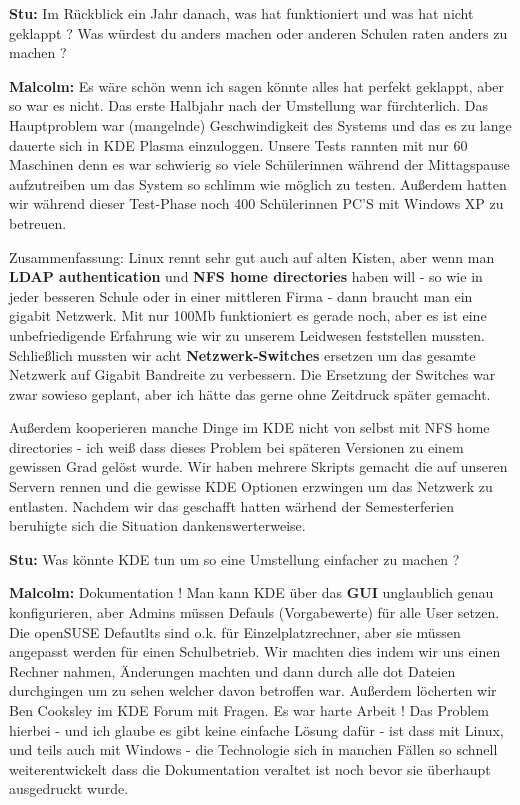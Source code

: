 \documentclass[10pt,a4paper,ngerman,twoside]{article} %
\begin{document}
\textbf{Stu:} Im Rückblick ein Jahr danach, was hat funktioniert und was hat nicht geklappt ? Was würdest du anders machen oder anderen Schulen raten anders zu machen ?

\textbf{Malcolm:} Es wäre schön wenn ich sagen könnte alles hat perfekt geklappt, aber so war es nicht. Das erste Halbjahr nach der Umstellung war fürchterlich. Das Hauptproblem war (mangelnde) Geschwindigkeit des Systems und das es zu lange dauerte sich in KDE Plasma einzuloggen. Unsere Tests rannten mit nur 60 Maschinen denn es war schwierig so viele Schülerinnen während der Mittagspause aufzutreiben um das System so schlimm wie möglich zu testen. Außerdem hatten wir während dieser Test-Phase noch 400 Schülerinnen PC'S mit Windows XP zu betreuen.

Zusammenfassung: Linux rennt sehr gut auch auf alten Kisten, aber wenn man \textbf{LDAP authentication} und \textbf{NFS home directories} haben will - so wie in jeder besseren Schule oder in einer mittleren Firma - dann braucht man ein gigabit Netzwerk. Mit nur 100Mb funktioniert es gerade noch, aber es ist eine unbefriedigende Erfahrung wie wir zu unserem Leidwesen feststellen mussten. Schließlich mussten wir acht \textbf{Netzwerk-Switches} ersetzen um das gesamte Netzwerk auf Gigabit Bandreite zu verbessern. Die Ersetzung der Switches war zwar sowieso geplant, aber ich hätte das gerne ohne Zeitdruck später gemacht.

Außerdem kooperieren manche Dinge im KDE nicht von selbst mit NFS home directories - ich weiß dass dieses Problem bei späteren Versionen zu einem gewissen Grad gelöst wurde. Wir haben mehrere Skripts gemacht die auf unseren Servern rennen und die gewisse KDE Optionen erzwingen um das Netzwerk zu entlasten. Nachdem wir das geschafft hatten wärhend der Semesterferien beruhigte sich die Situation dankenswerterweise.

\textbf{Stu:} Was könnte KDE tun um so eine Umstellung einfacher zu machen ?

\textbf{Malcolm:} Dokumentation ! Man kann KDE über das \textbf{GUI} unglaublich genau konfigurieren, aber Admins müssen Defauls (Vorgabewerte) für alle User setzen. Die openSUSE Defautlts sind o.k. für Einzelplatzrechner, aber sie müssen angepasst werden für einen Schulbetrieb. Wir machten dies indem wir uns einen Rechner nahmen, Änderungen machten und dann durch alle dot Dateien durchgingen um zu sehen welcher davon betroffen war. Außerdem löcherten wir Ben Cooksley im KDE Forum mit Fragen. Es war harte Arbeit ! Das Problem hierbei - und ich glaube es gibt keine einfache Lösung dafür - ist dass mit Linux, und teils auch mit Windows - die Technologie sich in manchen Fällen so schnell weiterentwickelt dass die Dokumentation veraltet ist noch bevor sie überhaupt ausgedruckt wurde.
 
\end{document}
